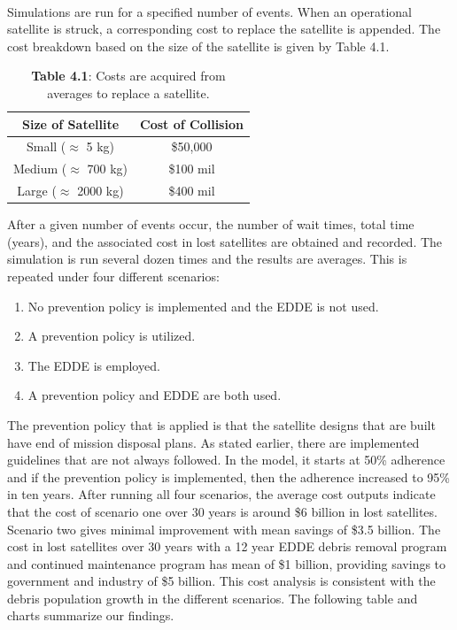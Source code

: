 \documentclass{article}
\theoremstyle{plain}			%
\theoremstyle{definition}		%
\theoremstyle{remark}
\numberwithin{equation}{section}
\numberwithin{figure}{section}
\numberwithin{table}{section}
\begin{document}
\\
Simulations are run for a specified number of events. When an operational satellite is struck, a corresponding cost to replace the satellite is appended. The cost breakdown based on the size of the satellite is given by Table 4.1.
\begin{table}[H]
\centering
\begin{tabular}{| c | c  | }
\hline
Size of Satellite & Cost of Collision \\
\hline
Small ($\approx$ 5 kg) & \$50,000 \\
\hline
Medium ($\approx$ 700 kg) & \$100 mil \\
\hline
Large ($\approx$ 2000 kg) & \$400 mil \\
\hline
\end{tabular}
\caption*{\small{\textbf{Table 4.1}: Costs are acquired from averages to replace a satellite.}}
\label{Modeltab1}
\end{table}
After a given number of events occur, the number of wait times, total time (years), and the associated cost in lost satellites are obtained and recorded. The simulation is run several dozen times and the results are averages. This is repeated under four different scenarios:
\begin{enumerate}
\item No prevention policy is implemented and the EDDE is not used.
\item A prevention policy is utilized.
\item The EDDE is employed.
\item A prevention policy and EDDE are both used.
\end{enumerate}

The prevention policy that is applied is that the satellite designs that are built have end of mission disposal plans. As stated earlier, there are implemented guidelines that are not always followed.  In the model, it starts at 50\% adherence and if the prevention policy is implemented, then the adherence increased to 95\% in ten years.
After running all four scenarios, the average cost outputs indicate that the cost of scenario one over 30 years is around \$6 billion in lost satellites. Scenario two gives minimal improvement with mean savings of \$3.5 billion. The cost in lost satellites over 30 years with a 12 year EDDE debris removal program and continued maintenance program has mean of \$1 billion, providing savings to government and industry of \$5 billion.  This cost analysis is consistent with the debris population growth in the different scenarios.  The following table and charts summarize our findings.
\end{document}
